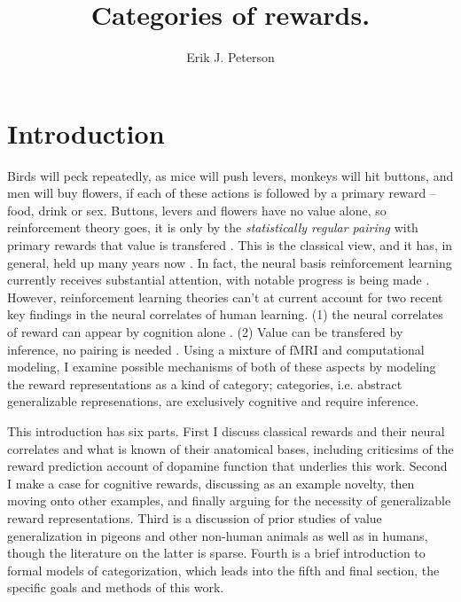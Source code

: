 \documentclass[doc,12pt]{apa}        %
\title{Categories of rewards.}
\author{Erik J. Peterson} \affiliation{Dept. of Psychology \\ Colorado State University \\ Fort Collins, CO}
\begin{document}
 
\maketitle

\section{Introduction} %
\label{sec:introduction}
Birds will peck repeatedly, as mice will push levers, monkeys will hit buttons, and men will buy flowers, if each of these actions is followed by a primary reward -- food, drink or sex.  Buttons, levers and flowers have no value alone, so reinforcement theory goes, it is only by the \emph{statistically regular pairing} with primary rewards that value is transfered \cite{Rescorla:1988p8743}.  This is the classical view, and it has, in general, held up many years now \cite{iversen:2007aa}.  In fact, the neural basis reinforcement learning currently receives substantial attention, with notable progress is being made \cite{Glimcher:2011p8464, Montague:2006mz}.  However, reinforcement learning theories can't at current account for two recent key findings in the neural correlates of human learning. (1) the neural correlates of reward can appear by cognition alone \cite{Hayden:2009p6545, Lohrenz:2007p7240, Tricomi:2008p6663, Jimura:2010p8305}. (2) Value can be transfered by inference, no pairing is needed \cite{BrombergMartin:2010p7223, Hampton:2006p2577}. Using a mixture of fMRI and computational modeling, I examine possible mechanisms of both of these aspects by modeling the reward representations as a kind of category; categories, i.e. abstract generalizable represenations, are exclusively cognitive and require inference.

This introduction has six parts.  First I discuss classical rewards and their neural correlates and what is known of their anatomical bases, including criticsims of the reward prediction account of dopamine function that underlies this work.  Second I make a case for cognitive rewards, discussing as an example novelty, then moving onto other examples, and finally arguing for the necessity of generalizable reward representations.  Third is a discussion of prior studies of value generalization in pigeons and other non-human animals as well as in humans, though the literature on the latter is sparse.  Fourth is a brief introduction to formal models of categorization, which leads into the fifth and final section, the specific goals and methods of this work.
\end{document}
